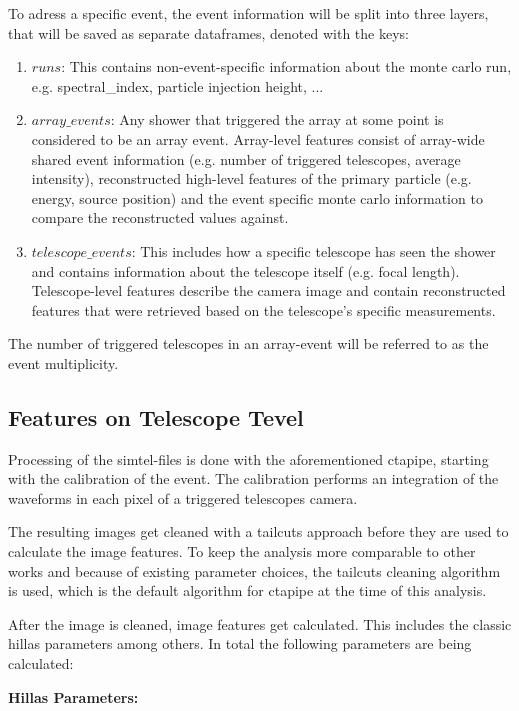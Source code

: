 To adress a specific event, the event information will be split into
three layers, that will be saved as separate dataframes, denoted with the keys:
\begin{enumerate}
    \item{$runs$: This contains non-event-specific information about the monte carlo run, e.g.
    spectral\_index, particle injection height, ...}
    \item{$array\_events$: Any shower that triggered the array at some point 
    is considered to be an array event.
    Array-level features consist of array-wide shared event information 
    (e.g. number of triggered telescopes, average intensity),
    reconstructed high-level features of the primary particle (e.g. energy, source position) and the 
    event specific monte carlo information to compare the reconstructed values against.}
    \item{$telescope\_events$: This includes how a specific telescope has seen the shower and
    contains information about the telescope itself (e.g. focal length). Telescope-level features 
    describe the camera image and contain reconstructed features that were retrieved based on 
    the telescope's specific measurements.}
\end{enumerate}

The number of triggered telescopes in an array-event 
will be referred to as the event multiplicity.

\subsection{Features on Telescope Tevel}
\label{sec:tel_analysis}

Processing of the simtel-files is done with the aforementioned ctapipe, starting with 
the calibration of the event. The calibration performs an integration of the waveforms in 
each pixel of a triggered telescopes camera. 

The resulting images get cleaned with a tailcuts approach before they are
used to calculate the image features.
To keep the analysis more comparable to other works and because
of existing parameter choices,
the tailcuts cleaning algorithm is used, which is the default algorithm
for ctapipe at the time of this analysis.

After the image is cleaned, image features get calculated.
This includes the classic hillas parameters among others.
In total the following parameters are being calculated:

\textbf{Hillas Parameters:}


